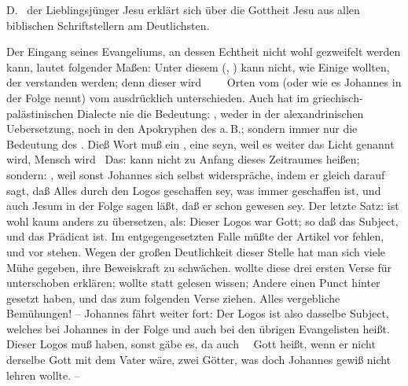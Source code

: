 \vabst D.~ der Lieblingsjünger Jesu erklärt sich über die Gottheit Jesu aus allen biblischen Schriftstellern am Deutlichsten.
\begin{aufzb}
\item Der Eingang seines Evangeliums, an dessen Echtheit nicht wohl gezweifelt werden kann, lautet folgender Maßen:  Unter diesem  (, ) kann nicht, wie Einige wollten, der  verstanden werden; denn dieser wird \ \ \ \uam\ Orten vom  (oder wie es Johannes in der Folge nennt) vom  ausdrücklich unterschieden. Auch hat  im griechisch-palästinischen Dialecte nie die Bedeutung: , weder in der alexandrinischen Uebersetzung, noch in den Apokryphen des a.\,B.; sondern immer nur die Bedeutung des . Dieß Wort muß ein , eine  seyn, weil es weiter das Licht genannt wird, Mensch wird \udgl\ Das:  kann nicht zu Anfang dieses Zeitraumes heißen; sondern: , weil sonst Johannes sich selbst widerspräche, indem er gleich darauf sagt, daß Alles durch den Logos geschaffen sey, was immer geschaffen ist, und auch Jesum in der Folge sagen läßt, daß er  schon gewesen sey. Der letzte Satz:  ist wohl kaum anders zu übersetzen, als: Dieser Logos war Gott; so daß  das Subject, und  das Prädicat ist. Im entgegengesetzten Falle müßte der Artikel  vor  fehlen, und vor  stehen. Wegen der großen Deutlichkeit dieser Stelle hat man sich viele Mühe gegeben, ihre Beweiskraft zu schwächen.  wollte diese drei ersten Verse für unterschoben erklären;  wollte  statt  gelesen wissen; Andere einen Punct hinter  gesetzt haben, und das  zum folgenden Verse ziehen. Alles vergebliche Bemühungen! -- Johannes fährt weiter fort:  Der Logos ist also dasselbe Subject, welches bei Johannes in der Folge und auch bei den übrigen Evangelisten  heißt. Dieser Logos muß  haben, sonst gäbe es, da auch~\  Gott heißt, wenn er nicht derselbe Gott mit dem Vater wäre, zwei Götter, was doch Johannes gewiß nicht lehren wollte. --

\end{aufzb}
